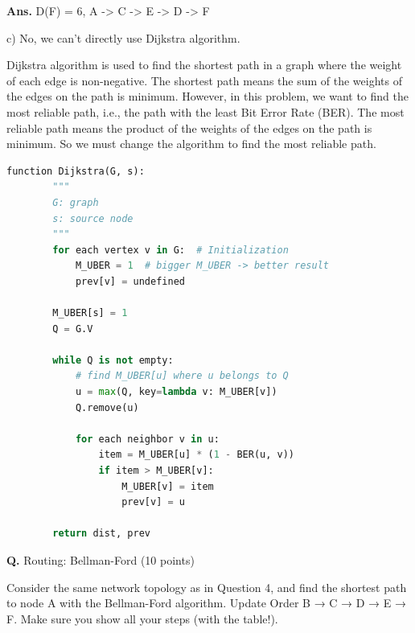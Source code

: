 \documentclass[12pt, a4paper, UTF8, fontset=windows]{ctexbook}
\newcounter{problemname}
\newenvironment{problem}{\begin{shaded}\stepcounter{problemname}\par\noindent\textbf{Q\arabic{problemname}.}}{\end{shaded}\par}
\newenvironment{solution}{\par\noindent\textbf{Ans.}}{\par}
\begin{document}
\begin{solution}
    D(F) = 6, A -> C -> E -> D -> F

    c) No, we can't directly use Dijkstra algorithm.

    Dijkstra algorithm is used to find the shortest path in a graph where the weight of each edge is non-negative. 
    The shortest path means the sum of the weights of the edges on the path is minimum. However, in this problem,
    we want to find the most reliable path, i.e., the path with the least Bit Error Rate (BER). 
    The most reliable path means the product of the weights of the edges on the path is minimum.
    So we must change the algorithm to find the most reliable path.

    \begin{lstlisting}[language=python]
    function Dijkstra(G, s):
        """
        G: graph
        s: source node
        """
        for each vertex v in G:  # Initialization
            M_UBER = 1  # bigger M_UBER -> better result
            prev[v] = undefined

        M_UBER[s] = 1
        Q = G.V

        while Q is not empty:
            # find M_UBER[u] where u belongs to Q
            u = max(Q, key=lambda v: M_UBER[v])
            Q.remove(u)

            for each neighbor v in u:
                item = M_UBER[u] * (1 - BER(u, v))
                if item > M_UBER[v]:
                    M_UBER[v] = item
                    prev[v] = u

        return dist, prev
    \end{lstlisting}
\end{solution}


\begin{problem}
    Routing: Bellman-Ford (10 points)

    Consider the same network topology as in Question 4, and find the shortest path to node A
    with the Bellman-Ford algorithm. Update Order B → C → D → E → F. Make sure you
    show all your steps (with the table!).
\end{problem}
\end{document}

